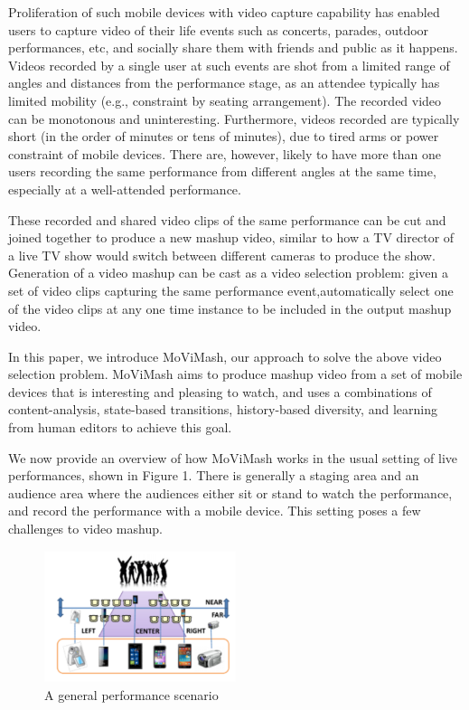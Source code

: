 \documentclass{new}
\begin{document}
Proliferation of such mobile devices with video capture capability has enabled users to capture video of their life events such as concerts, parades, outdoor performances, etc, and socially share them with friends and public as it happens. Videos recorded by a single user at such events are shot from a limited range of angles and distances from the performance stage, as an attendee typically has limited mobility (e.g., constraint by seating arrangement). The recorded video can be monotonous and uninteresting. Furthermore, videos recorded are typically short (in the order of minutes or tens of minutes), due to tired arms or power constraint of mobile devices. There are, however, likely to have more than one users recording the same performance from different angles at the same time, especially at a well-attended performance. 

These recorded and shared video clips of the same performance can be cut and joined together to produce a new mashup video, similar to how a TV director of a live TV show would switch between different cameras to produce the show. Generation of a video mashup can be cast as a video selection problem: given a set of video clips capturing the same performance event,automatically select one of the video clips at any one time instance to be included in the output mashup video.

In this paper, we introduce MoViMash, our approach to solve
the above video selection problem. MoViMash aims to produce
mashup video from a set of mobile devices that is interesting and
pleasing to watch, and uses a combinations of content-analysis,
state-based transitions, history-based diversity, and learning from
human editors to achieve this goal.

We now provide an overview of how MoViMash works in the
usual setting of live performances, shown in Figure 1. There is
generally a staging area and an audience area where the audiences either sit or stand to watch the performance, and record the performance with a mobile device. This setting poses a few challenges to video mashup.

\begin{figure}
    \centering
    \includegraphics[width=0.5\textwidth]{img1.png}
    \caption{A general performance scenario}
    \label{fig:1}
\end{figure}
\end{document}
